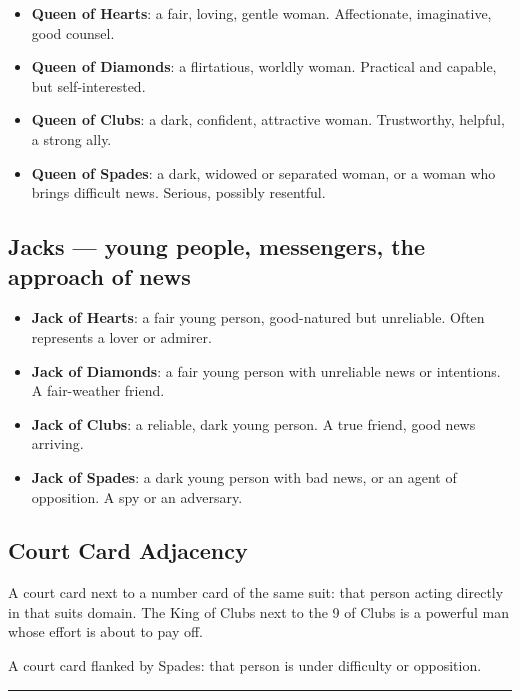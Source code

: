 \begin{itemize}
\tightlist
\item
  \textbf{Queen of Hearts}: a fair, loving, gentle woman. Affectionate, imaginative, good counsel.
\item
  \textbf{Queen of Diamonds}: a flirtatious, worldly woman. Practical and capable, but self-interested.
\item
  \textbf{Queen of Clubs}: a dark, confident, attractive woman. Trustworthy, helpful, a strong ally.
\item
  \textbf{Queen of Spades}: a dark, widowed or separated woman, or a woman who brings difficult news. Serious, possibly resentful.
\end{itemize}

\subsection{Jacks --- young people, messengers, the approach of news}\label{jacks--young-people-messengers-the-approach-of-news}

\begin{itemize}
\tightlist
\item
  \textbf{Jack of Hearts}: a fair young person, good-natured but unreliable. Often represents a lover or admirer.
\item
  \textbf{Jack of Diamonds}: a fair young person with unreliable news or intentions. A fair-weather friend.
\item
  \textbf{Jack of Clubs}: a reliable, dark young person. A true friend, good news arriving.
\item
  \textbf{Jack of Spades}: a dark young person with bad news, or an agent of opposition. A spy or an adversary.
\end{itemize}

\subsection{Court Card Adjacency}\label{court-card-adjacency}

A court card next to a number card of the same suit: that person acting directly in that suit\textquotesingle s domain. The King of Clubs next to the 9 of Clubs is a powerful man whose effort is about to pay off.

A court card flanked by Spades: that person is under difficulty or opposition.

\begin{center}\rule{0.5\linewidth}{0.5pt}\end{center}

